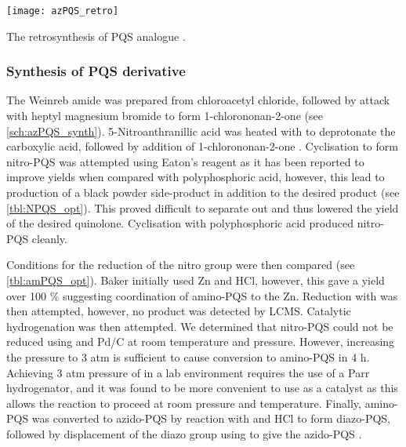 \begin{scheme}[H]
	\begin{center}
		\texttt{[image: azPQS\_retro]}
		\caption{The retrosynthesis of PQS analogue . \label{sch:azPQS_retro}}
	\end{center}
\end{scheme}

\subsubsection{Synthesis of PQS derivative }

The Weinreb amide  was prepared from chloroacetyl chloride, followed by attack with heptyl magnesium bromide  to form 1-chlorononan-2-one  (see \ref{sch:azPQS_synth}). 5-Nitroanthranillic acid  was heated with  to deprotonate the carboxylic acid, followed by addition of 1-chlorononan-2-one . Cyclisation to form nitro-PQS  was attempted using Eaton's reagent as it has been reported to improve yields when compared with polyphosphoric acid\cite{Eaton1973,Zewge2007}, however, this lead to production of a black powder side-product in addition to the desired product (see \ref{tbl:NPQS_opt}). This proved difficult to separate out and thus lowered the yield of the desired quinolone. Cyclisation with polyphosphoric acid produced nitro-PQS  cleanly\cite{Hlavac2004}. 

Conditions for the reduction of the nitro group were then compared (see \ref{tbl:amPQS_opt}). Baker initially used Zn and HCl, however, this gave a yield over 100 \% suggesting coordination of amino-PQS  to the Zn\cite{Baker2014}. Reduction with  was then attempted, however, no product was detected by LCMS. Catalytic hydrogenation was then attempted. We determined that nitro-PQS  could not be reduced using  and Pd/C at room temperature and pressure. However, increasing the pressure to 3 atm is sufficient to cause conversion to amino-PQS  in 4 h. Achieving 3 atm pressure of  in a lab environment requires the use of a Parr hydrogenator, and it was found to be more convenient to use  as a catalyst as this allows the reaction to proceed at room pressure and temperature\cite{Shen2006a}. Finally, amino-PQS  was converted to azido-PQS  by reaction with  and HCl to form diazo-PQS, followed by displacement of the diazo group using  to give the azido-PQS \cite{Xu2013}.

